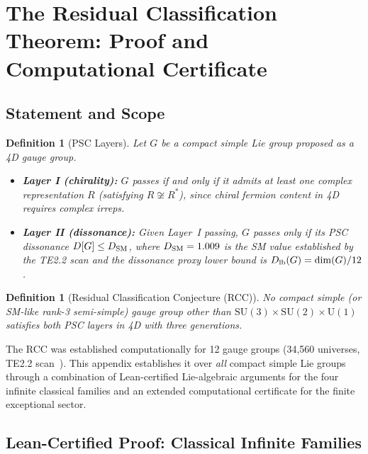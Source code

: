 \documentclass[11pt]{article}
\newtheorem{definition}[theorem]{Definition}
\theoremstyle{remark}
\begin{document}
\section{The Residual Classification Theorem: Proof and Computational Certificate}
\label{app:rcc}

\subsection{Statement and Scope}

\begin{definition}[PSC Layers]
Let $G$ be a compact simple Lie group proposed as a 4D gauge group.
\begin{itemize}[leftmargin=1.5em,itemsep=2pt]
  \item \textbf{Layer I (chirality):} $G$ passes if and only if it admits at least one complex representation $R$ (satisfying $R \not\cong R^*$), since chiral fermion content in 4D requires complex irreps.
  \item \textbf{Layer II (dissonance):} Given Layer~I passing, $G$ passes only if its PSC dissonance $D[G] \le D_{\rm SM}$, where $D_{\rm SM} = 1.009$ is the SM value established by the TE2.2 scan and the dissonance proxy lower bound is $D_{\rm lb}(G) = \dim(G)/12$.
\end{itemize}
\end{definition}

\begin{definition}[Residual Classification Conjecture (RCC)]
No compact simple (or SM-like rank-3 semi-simple) gauge group other than $\mathrm{SU}(3)\times\mathrm{SU}(2)\times\mathrm{U}(1)$ satisfies both PSC layers in 4D with three generations.
\end{definition}

The RCC was established computationally for 12 gauge groups (34,560 universes, TE2.2 scan~\cite{SpivackNEMS05}).  This appendix establishes it over \emph{all} compact simple Lie groups through a combination of Lean-certified Lie-algebraic arguments for the four infinite classical families and an extended computational certificate for the finite exceptional sector.

\subsection{Lean-Certified Proof: Classical Infinite Families}
\label{app:rcc:lean}
\end{document}
